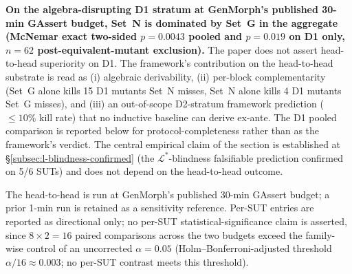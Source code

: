 \documentclass[acmsmall, screen]{acmart}
\begin{document}
\textbf{On the algebra-disrupting D1 stratum at GenMorph's published
30-min GAssert budget, Set~N is dominated by Set~G in the aggregate
(McNemar exact two-sided $p = 0.0043$ pooled and $p = 0.019$ on D1
only, $n = 62$ post-equivalent-mutant exclusion).} The paper does not
assert head-to-head superiority on D1. The framework's contribution
on the head-to-head substrate is read as (i) algebraic derivability,
(ii) per-block complementarity (Set~G alone kills 15 D1 mutants
Set~N misses, Set~N alone kills 4 D1 mutants Set~G misses), and
(iii) an out-of-scope D2-stratum framework prediction
($\le 10\%$ kill rate) that no inductive baseline can derive
ex-ante. The D1 pooled comparison is reported below for
protocol-completeness rather than as the framework's verdict. The
central empirical claim of the section is established at
\S\ref{subsec:l-blindness-confirmed} (the $\mathcal{L}^{*}$-blindness
falsifiable prediction confirmed on 5/6 SUTs) and does not depend on
the head-to-head outcome.

The head-to-head is run at GenMorph's published 30-min GAssert budget;
a prior 1-min run is retained as a sensitivity reference. Per-SUT
entries are reported as directional only; no per-SUT
statistical-significance claim is asserted, since $8\times 2 = 16$
paired comparisons across the two budgets exceed the family-wise
control of an uncorrected $\alpha = 0.05$ (Holm--Bonferroni-adjusted
threshold $\alpha/16 \approx 0.003$; no per-SUT contrast meets this
threshold).
\end{document}
